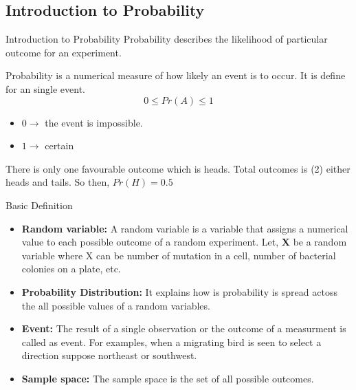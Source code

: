 \documentclass{beamer}
\begin{document}
\subsection{Introduction to Probability}
\begin{frame}{Introduction to Probability}
Probability describes the likelihood of particular outcome for an experiment.

\begin{definition}
    Probability is a numerical measure of how likely an event is to occur. It is define for an single event.
    \begin{equation}
        0\leq Pr(A) \leq1
    \end{equation}
    \begin{itemize}
        \item $0\xrightarrow{}$ the event is impossible.
        \item $1\xrightarrow{}$ certain
    \end{itemize}
\end{definition}
\begin{example}    
    There is only one favourable outcome which is heads. Total outcomes is (2) either heads and tails. So then, $Pr(H)=0.5$
\end{example}
\end{frame}
\begin{frame}{Basic Definition}
\begin{itemize}
    \item \textbf{Random variable:} A random variable is a variable that assigns a numerical value to each possible outcome of a random experiment. Let,\textbf{ X} be a random variable where X can be number of mutation in a cell, number of bacterial colonies on a plate, etc.\vspace{0.2cm}
    \item \textbf{Probability Distribution:} It explains how is probability is spread actoss the all possible values of a random variables. \vspace{0.2cm}
    \item \textbf{Event:} The result of a single observation or the outcome of a measurment is called as event. For examples, when a migrating bird is seen to select a direction suppose northeast or southwest. 
    \vspace{0.2cm}
    \item \textbf{Sample space:} The sample space is the set of all possible outcomes.
\end{itemize}

    
\end{frame}
\end{document}
